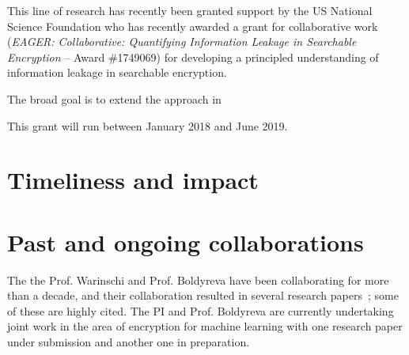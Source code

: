 This line of research has recently been granted support by the US National Science Foundation who has recently awarded a grant for collaborative work (\textit{EAGER: Collaborative: Quantifying Information Leakage in Searchable Encryption} -- Award \#1749069) for developing a principled understanding of information leakage in searchable encryption. 

The broad goal is to extend the approach in ~\cite{bernhard2012measuring} 


This grant will run between January 2018 and June 2019. 



\section{Timeliness and impact} 





\section{Past and ongoing collaborations}
\label{sec:prop_method}
The the Prof. Warinschi and Prof. Boldyreva have been collaborating for more than a decade, and their collaboration resulted in several research papers~\cite{boldyreva2007closer,boldyreva2009foundations,boldyreva2012secure,lipton2016provably}; some of these are  highly cited. 
The PI and Prof. Boldyreva are currently undertaking joint work in the area of encryption for machine learning with one research paper under submission and another one in preparation. 











